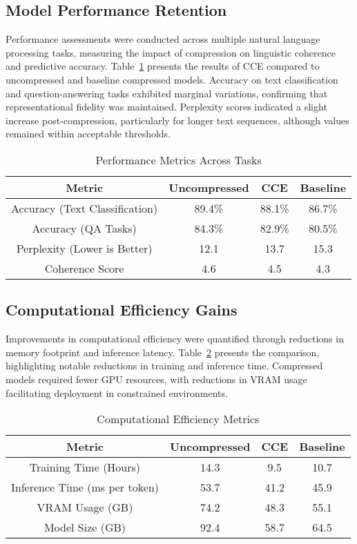 \documentclass{article}
\begin{document}
\subsection{Model Performance Retention}

Performance assessments were conducted across multiple natural language processing tasks, measuring the impact of compression on linguistic coherence and predictive accuracy. Table~\ref{tab:performance_metrics} presents the results of CCE compared to uncompressed and baseline compressed models. Accuracy on text classification and question-answering tasks exhibited marginal variations, confirming that representational fidelity was maintained. Perplexity scores indicated a slight increase post-compression, particularly for longer text sequences, although values remained within acceptable thresholds.

\begin{table}[t]
	\centering
	\caption{Performance Metrics Across Tasks}
	\label{tab:performance_metrics}
		\begin{tabular}{cccc}
			\hline
			\textbf{Metric} & \textbf{Uncompressed} & \textbf{CCE} & \textbf{Baseline} \\
			\hline
			Accuracy (Text Classification) & 89.4\%  & 88.1\%  & 86.7\%  \\
			Accuracy (QA Tasks) & 84.3\%  & 82.9\%  & 80.5\%  \\
			Perplexity (Lower is Better) & 12.1  & 13.7  & 15.3  \\
			Coherence Score & 4.6  & 4.5  & 4.3  \\
			\hline
		\end{tabular}%
\end{table}



\subsection{Computational Efficiency Gains}

Improvements in computational efficiency were quantified through reductions in memory footprint and inference latency. Table~\ref{tab:efficiency_metrics} presents the comparison, highlighting notable reductions in training and inference time. Compressed models required fewer GPU resources, with reductions in VRAM usage facilitating deployment in constrained environments.

\begin{table}[t]
	\centering
	\caption{Computational Efficiency Metrics}
	\label{tab:efficiency_metrics}
		\begin{tabular}{cccc}
			\hline
			\textbf{Metric} & \textbf{Uncompressed} & \textbf{CCE} & \textbf{Baseline} \\
			\hline
			Training Time (Hours) & 14.3  & 9.5  & 10.7  \\
			Inference Time (ms per token) & 53.7  & 41.2  & 45.9  \\
			VRAM Usage (GB) & 74.2  & 48.3  & 55.1  \\
			Model Size (GB) & 92.4  & 58.7  & 64.5  \\
			\hline
		\end{tabular}%
\end{table}
\end{document}

